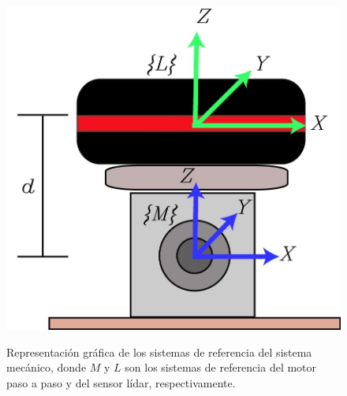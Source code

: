 \begin{figure}[ht!]
\centering \footnotesize
 {\includegraphics[width=0.55\linewidth]{images/lidar_kbki.jpg}}
 \captionsetup{font=footnotesize}
 \caption{Representación gráfica de los sistemas de referencia del sistema 
 mecánico, donde $M$ y $L$ son los sistemas de referencia del motor paso a 
 paso y del sensor lídar, respectivamente.}
\label{f:FrameSitemaMecanico}
\end{figure}

